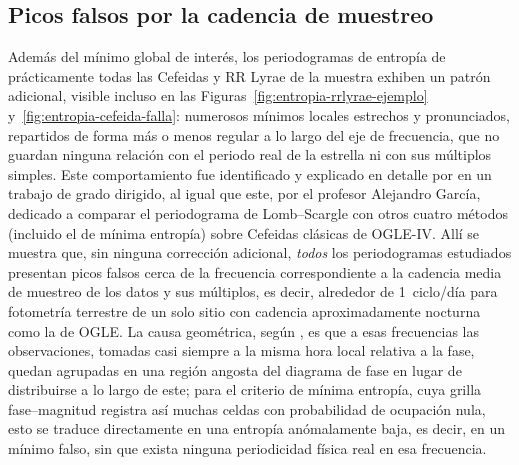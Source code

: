 \documentclass[12pt,letterpaper,oneside]{book}
\begin{document}
\subsection{Picos falsos por la cadencia de muestreo}
\label{sec:resultados-entropia-picos-falsos}

Adem\'as del m\'inimo global de inter\'es, los periodogramas de entrop\'ia de pr\'acticamente todas las Cefeidas y RR Lyrae de la muestra exhiben un patr\'on adicional, visible incluso en las Figuras~\ref{fig:entropia-rrlyrae-ejemplo} y~\ref{fig:entropia-cefeida-falla}: numerosos m\'inimos locales estrechos y pronunciados, repartidos de forma m\'as o menos regular a lo largo del eje de frecuencia, que no guardan ninguna relaci\'on con el periodo real de la estrella ni con sus m\'ultiplos simples. Este comportamiento fue identificado y explicado en detalle por \citet{Henao2021} en un trabajo de grado dirigido, al igual que este, por el profesor Alejandro Garc\'ia, dedicado a comparar el periodograma de Lomb--Scargle con otros cuatro m\'etodos (incluido el de m\'inima entrop\'ia) sobre Cefeidas cl\'asicas de OGLE-IV. All\'i se muestra que, sin ninguna correcci\'on adicional, \emph{todos} los periodogramas estudiados presentan picos falsos cerca de la frecuencia correspondiente a la cadencia media de muestreo de los datos y sus m\'ultiplos, es decir, alrededor de 1~ciclo/d\'ia para fotometr\'ia terrestre de un solo sitio con cadencia aproximadamente nocturna como la de OGLE. La causa geom\'etrica, seg\'un \citet{Henao2021}, es que a esas frecuencias las observaciones, tomadas casi siempre a la misma hora local relativa a la fase, quedan agrupadas en una regi\'on angosta del diagrama de fase en lugar de distribuirse a lo largo de este; para el criterio de m\'inima entrop\'ia, cuya grilla fase--magnitud registra as\'i muchas celdas con probabilidad de ocupaci\'on nula, esto se traduce directamente en una entrop\'ia an\'omalamente baja, es decir, en un m\'inimo falso, sin que exista ninguna periodicidad f\'isica real en esa frecuencia.
\end{document}
